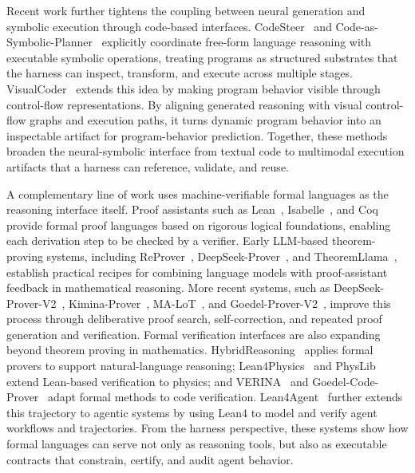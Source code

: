 Recent work further tightens the coupling between neural generation and symbolic execution through code-based interfaces. CodeSteer~\cite{chen2025codesteer} and Code-as-Symbolic-Planner~\cite{chen2025code} explicitly coordinate free-form language reasoning with executable symbolic operations, treating programs as structured substrates that the harness can inspect, transform, and execute across multiple stages. VisualCoder~\cite{chi-etal-2025-visualcoder} extends this idea by making program behavior visible through control-flow representations. By aligning generated reasoning with visual control-flow graphs and execution paths, it turns dynamic program behavior into an inspectable artifact for program-behavior prediction. Together, these methods broaden the neural-symbolic interface from textual code to multimodal execution artifacts that a harness can reference, validate, and reuse.

A complementary line of work uses machine-verifiable formal languages as the reasoning interface itself. Proof assistants such as Lean~\cite{moura2021lean}, Isabelle~\cite{nipkow2002isabelle}, and Coq~\cite{barras1999coq} provide formal proof languages based on rigorous logical foundations, enabling each derivation step to be checked by a verifier. Early LLM-based theorem-proving systems, including ReProver~\cite{yang2023leandojo}, DeepSeek-Prover~\cite{xin2025deepseek}, and TheoremLlama~\cite{wang2024theoremllama}, establish practical recipes for combining language models with proof-assistant feedback in mathematical reasoning. More recent systems, such as DeepSeek-Prover-V2~\cite{ren2025deepseek2}, Kimina-Prover~\cite{wang2025kimina}, MA-LoT~\cite{wang2025ma}, and Goedel-Prover-V2~\cite{lin2025goedel2}, improve this process through deliberative proof search, self-correction, and repeated proof generation and verification.
Formal verification interfaces are also expanding beyond theorem proving in mathematics. HybridReasoning~\cite{wang2025let} applies formal provers to support natural-language reasoning; Lean4Physics~\cite{li2025lean4physics} and PhysLib~\cite{physlib} extend Lean-based verification to physics; and VERINA~\cite{ye2025verina} and Goedel-Code-Prover~\cite{li2026goedel} adapt formal methods to code verification. Lean4Agent~\cite{wang2026lean4agent} further extends this trajectory to agentic systems by using Lean4 to model and verify agent workflows and trajectories. From the harness perspective, these systems show how formal languages can serve not only as reasoning tools, but also as executable contracts that constrain, certify, and audit agent behavior.



